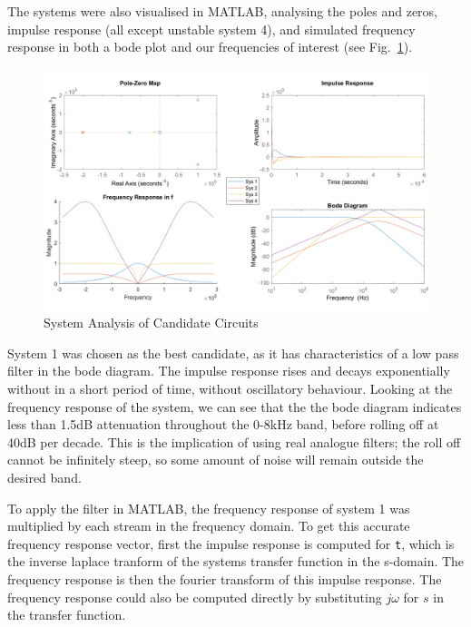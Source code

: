 \documentclass[12pt]{article}
\numberwithin{equation}{section}
\numberwithin{figure}{section}
\numberwithin{table}{section}
\begin{document}
The systems were also visualised in MATLAB, analysing the poles and zeros,
impulse response (all except unstable system 4), and simulated frequency
response in both a bode plot and our frequencies of interest (see
Fig.~\ref{fig:p3-sys-analysis}).

\begin{figure}[ht]
    \centering
    \includegraphics[width=14cm]{figures/p3-sys-analysis.png}
    \caption{System Analysis of Candidate Circuits\label{fig:p3-sys-analysis}}
\end{figure}

System 1 was chosen as the best candidate, as it has characteristics of a low
pass filter in the bode diagram. The impulse response rises and decays
exponentially without in a short period of time, without oscillatory behaviour.
Looking at the frequency response of the system, we can see that the the bode
diagram indicates less than 1.5dB attenuation throughout the 0-8kHz band,
before rolling off at 40dB per decade. This is the implication of using real
analogue filters; the roll off cannot be infinitely steep, so some amount of
noise will remain outside the desired band.

To apply the filter in MATLAB, the frequency response of system 1 was
multiplied by each stream in the frequency domain. To get this accurate
frequency response vector, first the impulse response is computed for \verb+t+,
which is the inverse laplace tranform of the systems transfer function in the
s-domain. The frequency response is then the fourier transform of this impulse
response. The frequency response could also be computed directly by
substituting $j\omega$ for $s$ in the transfer function.
\end{document}
